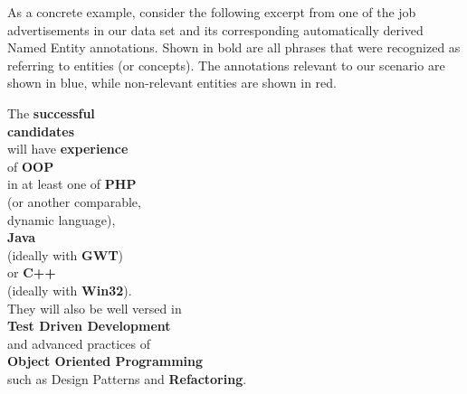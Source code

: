 \documentclass[conference]{IEEEtran}
\begin{document}
As a concrete example, consider the following excerpt from one of the job
advertisements in our data set and its corresponding automatically derived Named
Entity annotations. Shown in bold are all phrases that were recognized as
referring to entities (or concepts). The annotations relevant to our scenario
are shown in blue, while non-relevant entities are shown in red.  \vspace{1cm}

{\small

\noindent The \textbf{successful} \\
\textbf{candidates}  \\
will have \textbf{experience} \\
of \textbf{OOP} \\
in at least one of \textbf{PHP} \\
(or another comparable,\\
dynamic language), \\
\textbf{Java} \\
(ideally with \textbf{GWT}) \\
or \textbf{C++} \\
(ideally with \textbf{Win32}). \\
They will also be well versed in\\
\textbf{Test Driven Development} \\
and advanced practices of\\
{\footnotesize\textbf{Object Oriented Programming}}  \\
such as Design Patterns and \textbf{Refactoring}. }\\
\end{document}
